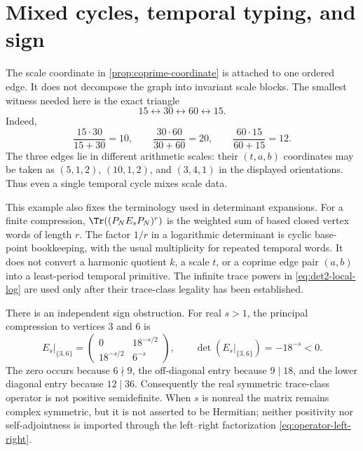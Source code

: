 \section{Mixed cycles, temporal typing, and sign}
\label{sec:cycles-sign}

The scale coordinate in \cref{prop:coprime-coordinate} is attached to one
ordered edge.  It does not decompose the graph into invariant scale blocks.
The smallest witness needed here is the exact triangle
\[
 15\longleftrightarrow30\longleftrightarrow60
 \longleftrightarrow15.
\]
Indeed,
\begin{equation}
 \frac{15\cdot30}{15+30}=10,
 \qquad
 \frac{30\cdot60}{30+60}=20,
 \qquad
 \frac{60\cdot15}{60+15}=12.
 \label{eq:mixed-triangle}
\end{equation}
The three edges lie in different arithmetic scales: their
$(t,a,b)$ coordinates may be taken as $(5,1,2)$, $(10,1,2)$, and
$(3,4,1)$ in the displayed orientations.  Thus even a single temporal
cycle mixes scale data.

This example also fixes the terminology used in determinant expansions.
For a finite compression, $\Tr((P_NE_sP_N)^r)$ is the weighted sum of based
closed vertex words of length $r$.  The factor $1/r$ in a logarithmic
determinant is cyclic base-point bookkeeping, with the usual multiplicity
for repeated temporal words.  It does not convert a harmonic quotient
$k$, a scale $t$, or a coprime edge pair $(a,b)$ into a least-period
temporal primitive.  The infinite trace powers in
\cref{eq:det2-local-log} are used only after their trace-class legality has
been established.

There is an independent sign obstruction.  For real $s>1$, the principal
compression to vertices $3$ and $6$ is
\begin{equation}
 E_s\big|_{\{3,6\}}
 =\begin{pmatrix}
     0&18^{-s/2}\\
     18^{-s/2}&6^{-s}
   \end{pmatrix},
 \qquad
 \det\!(E_s|_{\{3,6\}})=-18^{-s}<0.
 \label{eq:negative-minor}
\end{equation}
The zero occurs because $6\nmid9$, the off-diagonal entry because
$9\mid18$, and the lower diagonal entry because $12\mid36$.
Consequently the real symmetric trace-class operator is not positive
semidefinite.  When $s$ is nonreal the matrix remains complex symmetric,
but it is not asserted to be Hermitian; neither positivity nor
self-adjointness is imported through the left--right factorization
\eqref{eq:operator-left-right}.

\FigureMixedCycle
